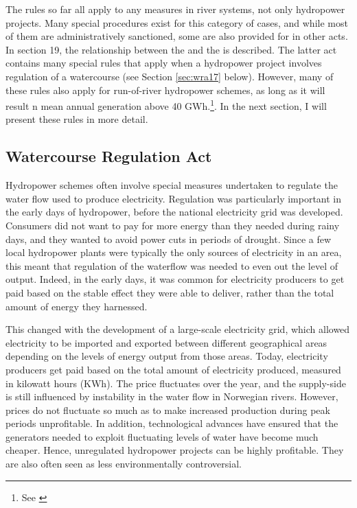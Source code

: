 The rules so far all apply to any measures in river systems, not only hydropower projects. Many special procedures exist for this category of cases, and while most of them are administratively sanctioned, some are also provided for in other acts. In section 19, the relationship between the \cite{wra00} and the \cite{wra00} is described. The latter act contains many special rules that apply when a hydropower project involves regulation of a watercourse (see Section \ref{sec:wra17} below). However, many of these rules also apply for run-of-river hydropower schemes, as long as it will result n mean annual generation above 40 GWh.\footnote{See \cite[19]{wra00}}. In the next section, I will present these rules in more detail. 

\subsection{Watercourse Regulation Act}

Hydropower schemes often involve special measures undertaken to regulate the water flow used to produce electricity. Regulation was particularly important in the early days of hydropower, before the national electricity grid was developed. Consumers did not want to pay for more energy than they needed during rainy days, and they wanted to avoid power cuts in periods of drought. Since a few local hydropower plants were typically the only sources of electricity in an area, this meant that regulation of the waterflow was needed to even out the level of output. Indeed, in the early days, it was common for electricity producers to get paid based on the stable effect they were able to deliver, rather than the total amount of energy they harnessed. 

This changed with the development of a large-scale electricity grid, which allowed electricity to be imported and exported between different geographical areas depending on the levels of energy output from those areas. Today, electricity producers get paid based on the total amount of electricity produced, measured in kilowatt hours (KWh). The price fluctuates over the year, and the supply-side is still influenced by instability in the water flow in Norwegian rivers. However, prices do not fluctuate so much as to make increased production during peak periods unprofitable. In addition, technological advances have ensured that the generators needed to exploit fluctuating levels of water have become much cheaper. Hence, unregulated hydropower projects can be highly profitable. They are also often seen as less environmentally controversial.


